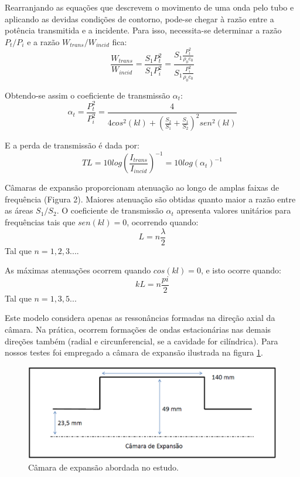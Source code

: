 Rearranjando as equações que descrevem o movimento de uma onda pelo tubo e aplicando as devidas condições de contorno, pode-se chegar à razão entre a potência transmitida e a incidente. Para isso, necessita-se determinar a razão $P_{t}/P_{i}$ e a razão $W_{trans}/W_{incid}$ fica:
\begin{equation}
    \frac{W_{trans}}{W_{incid}} = \frac{S_{1}P_{t}^{2}}{S_{1}P_{i}^{2}} = \frac{S_{1}\frac{P_{t}^{2}}{\rho_{0}c_{0}}}{S_{1}\frac{P_{i}^{2}}{\rho_{0}c_{0}}}
\end{equation}

Obtendo-se assim o coeficiente de transmissão $\alpha_{t}$:
\begin{equation}
    \alpha_{t} = \frac{P_{t}^{2}}{P_{i}^{2}} = \frac{4}{4cos^{2}(kl)+(\frac{S_{2}}{S_{1}}+\frac{S_{1}}{S_{2}})^{2}sen^{2}(kl)}
\end{equation}

E a perda de transmissão é dada por:
\begin{equation}
    TL = 10log(\frac{I_{trans}}{I_{incid}})^{-1} = 10log(\alpha_{t})^{-1}
\end{equation}

Câmaras de expansão proporcionam atenuação ao longo de amplas faixas de frequência (Figura 2). Maiores atenuação são obtidas quanto maior a razão entre as áreas $S_{1}/S_{2}$. O coeficiente de transmissão $\alpha_{t}$ apresenta valores unitários para frequências tais que $sen(kl) = 0$, ocorrendo quando:
\begin{equation}
    L = n\frac{\lambda}{2}
\end{equation}
Tal que $n = 1,2,3...$.

As máximas atenuações ocorrem quando $cos(kl) = 0$, e isto ocorre quando:
\begin{equation}
    kL = n\frac{pi}{2}
\end{equation}
Tal que $n = 1,3,5 ...$

Este modelo considera apenas as ressonâncias formadas na direção axial da câmara. Na prática, ocorrem formações de ondas estacionárias nas demais direções também (radial e circunferencial, se a cavidade for cilíndrica). Para nossos testes foi empregado a câmara de expansão ilustrada na figura \ref{camara_2}.

\begin{figure}[h]
\centering
\includegraphics[scale=0.32]{camara_2.eps}
\caption{Câmara de expansão abordada no estudo.}
\label{camara_2}
\end{figure}

